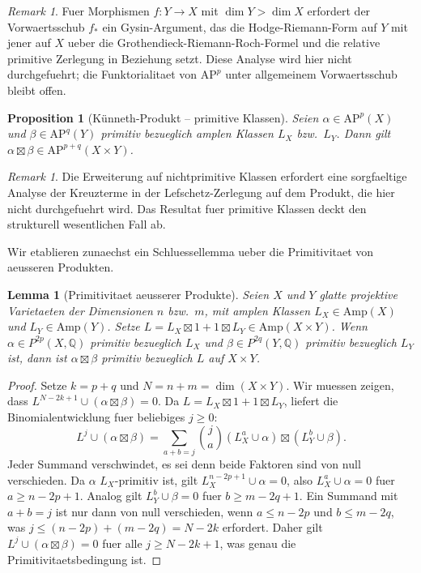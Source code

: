 \documentclass[aps,prd,twocolumn,superscriptaddress,nofootinbib]{revtex4-2}
\newtheorem{proposition}[theorem]{Proposition}
\newtheorem{lemma}[theorem]{Lemma}
\theoremstyle{definition}
\theoremstyle{remark}
\newtheorem{remark}[theorem]{Remark}
\begin{document}
\begin{remark}
Fuer Morphismen $f: Y \to X$ mit $\dim Y > \dim X$ erfordert der Vorwaertsschub $f_*$ ein Gysin-Argument, das die Hodge-Riemann-Form auf $Y$ mit jener auf $X$ ueber die Grothendieck-Riemann-Roch-Formel und die relative primitive Zerlegung in Beziehung setzt. Diese Analyse wird hier nicht durchgefuehrt; die Funktorialitaet von $\mathrm{AP}^p$ unter allgemeinem Vorwaertsschub bleibt offen.
\end{remark}

\begin{proposition}[K\"unneth-Produkt -- primitive Klassen]
\label{prop:kunneth}
Seien $\alpha \in \mathrm{AP}^p(X)$ und $\beta \in \mathrm{AP}^q(Y)$ primitiv bezueglich amplen Klassen $L_X$ bzw.\ $L_Y$. Dann gilt $\alpha \boxtimes \beta \in \mathrm{AP}^{p+q}(X \times Y)$.
\end{proposition}

\begin{remark}
Die Erweiterung auf nichtprimitive Klassen erfordert eine sorgfaeltige Analyse der Kreuzterme in der Lefschetz-Zerlegung auf dem Produkt, die hier nicht durchgefuehrt wird. Das Resultat fuer primitive Klassen deckt den strukturell wesentlichen Fall ab.
\end{remark}

Wir etablieren zunaechst ein Schluessellemma ueber die Primitivitaet von aeusseren Produkten.

\begin{lemma}[Primitivitaet aeusserer Produkte]
\label{lem:primitive_product}
Seien $X$ und $Y$ glatte projektive Varietaeten der Dimensionen $n$ bzw.\ $m$, mit amplen Klassen $L_X \in \mathrm{Amp}(X)$ und $L_Y \in \mathrm{Amp}(Y)$. Setze $L = L_X \boxtimes 1 + 1 \boxtimes L_Y \in \mathrm{Amp}(X \times Y)$. Wenn $\alpha \in P^{2p}(X, \mathbb{Q})$ primitiv bezueglich $L_X$ und $\beta \in P^{2q}(Y, \mathbb{Q})$ primitiv bezueglich $L_Y$ ist, dann ist $\alpha \boxtimes \beta$ primitiv bezueglich $L$ auf $X \times Y$.
\end{lemma}

\begin{proof}
Setze $k = p + q$ und $N = n + m = \dim(X \times Y)$. Wir muessen zeigen, dass $L^{N-2k+1} \cup (\alpha \boxtimes \beta) = 0$. Da $L = L_X \boxtimes 1 + 1 \boxtimes L_Y$, liefert die Binomialentwicklung fuer beliebiges $j \geq 0$:
\[
L^j \cup (\alpha \boxtimes \beta) = \sum_{a+b=j} \binom{j}{a} (L_X^a \cup \alpha) \boxtimes (L_Y^b \cup \beta).
\]
Jeder Summand verschwindet, es sei denn beide Faktoren sind von null verschieden. Da $\alpha$ $L_X$-primitiv ist, gilt $L_X^{n-2p+1} \cup \alpha = 0$, also $L_X^a \cup \alpha = 0$ fuer $a \geq n - 2p + 1$. Analog gilt $L_Y^b \cup \beta = 0$ fuer $b \geq m - 2q + 1$. Ein Summand mit $a + b = j$ ist nur dann von null verschieden, wenn $a \leq n - 2p$ und $b \leq m - 2q$, was $j \leq (n - 2p) + (m - 2q) = N - 2k$ erfordert. Daher gilt $L^j \cup (\alpha \boxtimes \beta) = 0$ fuer alle $j \geq N - 2k + 1$, was genau die Primitivitaetsbedingung ist.
\end{proof}
\end{document}
